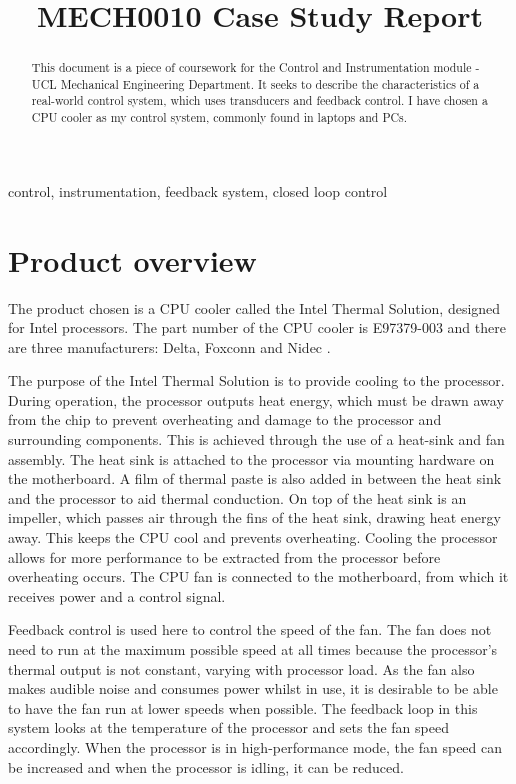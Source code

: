 \documentclass[conference]{IEEEtran}
\begin{document}
\title{MECH0010 Case Study Report}

\author{}

\maketitle

\begin{abstract}
This document is a piece of coursework for the Control and Instrumentation module - UCL Mechanical Engineering Department. It seeks to describe the characteristics of a real-world control system, which uses transducers and feedback control. I have chosen a CPU cooler as my control system, commonly found in laptops and PCs.
\end{abstract}

\begin{IEEEkeywords}
control, instrumentation, feedback system, closed loop control
\end{IEEEkeywords}

\section{Product overview}
The product chosen is a CPU cooler called the Intel Thermal Solution, designed for Intel processors. The part number of the CPU cooler is E97379-003 and there are three manufacturers: Delta, Foxconn and Nidec \cite{b1}. 

The purpose of the Intel Thermal Solution is to provide cooling to the processor. During operation, the processor outputs heat energy, which must be drawn away from the chip to prevent overheating and damage to the processor and surrounding components. This is achieved through the use of a heat-sink and fan assembly. The heat sink is attached to the processor via mounting hardware on the motherboard. A film of thermal paste is also added in between the heat sink and the processor to aid thermal conduction. On top of the heat sink is an impeller, which passes air through the fins of the heat sink, drawing heat energy away. This keeps the CPU cool and prevents overheating. Cooling the processor allows for more performance to be extracted from the processor before overheating occurs. The CPU fan is connected to the motherboard, from which it receives power and a control signal. 

Feedback control is used here to control the speed of the fan. The fan does not need to run at the maximum possible speed at all times because the processor's thermal output is not constant, varying with processor load. As the fan also makes audible noise and consumes power whilst in use, it is desirable to be able to have the fan run at lower speeds when possible. The feedback loop in this system looks at the temperature of the processor and sets the fan speed accordingly. When the processor is in high-performance mode, the fan speed can be increased and when the processor is idling, it can be reduced. 
\end{document}
